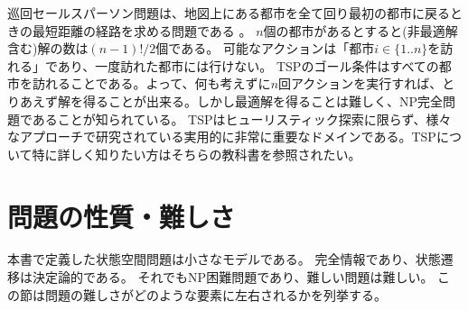 巡回セールスパーソン問題は、地図上にある都市を全て回り最初の都市に戻るときの最短距離の経路を求める問題である \cite{applegate2006traveling}。
$n$個の都市があるとすると(非最適解含む)解の数は$(n-1)!/2$個である。
可能なアクションは「都市$i \in \{1..n\}$を訪れる」であり、一度訪れた都市には行けない。
TSPのゴール条件はすべての都市を訪れることである。よって、何も考えずに$n$回アクションを実行すれば、とりあえず解を得ることが出来る。しかし最適解を得ることは難しく、NP完全問題であることが知られている。
TSPはヒューリスティック探索に限らず、様々なアプローチで研究されている実用的に非常に重要なドメインである\cite{applegate2006traveling}。TSPについて特に詳しく知りたい方はそちらの教科書を参照されたい。


\section{問題の性質・難しさ}
\label{sec:difficulity}

本書で定義した状態空間問題は小さなモデルである。
完全情報であり、状態遷移は決定論的である。
それでもNP困難問題であり、難しい問題は難しい。
この節は問題の難しさがどのような要素に左右されるかを列挙する。

